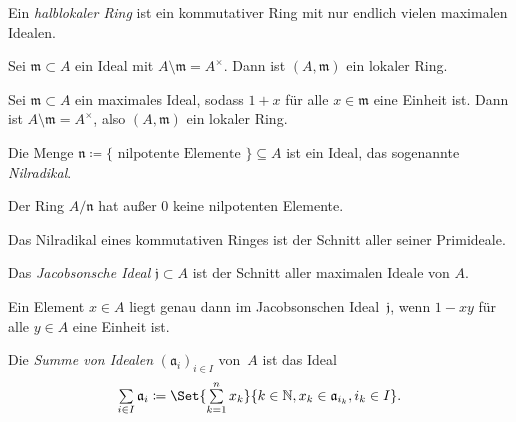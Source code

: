 \documentclass{cheat-sheet}
\newcommand{\aaa}{\mathfrak{a}}
\newcommand{\jjj}{\mathfrak{j}}
\newcommand{\mmm}{\mathfrak{m}}
\newcommand{\nnn}{\mathfrak{n}}
\begin{document}
\begin{defn}
  Ein \emph{halblokaler Ring} ist ein kommutativer Ring mit nur endlich vielen maximalen Idealen.
\end{defn}

\begin{lem}
  Sei $\mmm \subset A$ ein Ideal mit $A \setminus \mmm = A^\times$.
  Dann ist $(A, \mmm)$ ein lokaler Ring.
\end{lem}

\begin{prop}
  Sei $\mmm \subset A$ ein maximales Ideal, sodass $1 + x$ für alle $x \in \mmm$ eine Einheit ist.
  Dann ist $A \setminus \mmm = A^\times$, also $(A, \mmm)$ ein lokaler Ring.
\end{prop}



\begin{prop}
  Die Menge $\nnn \coloneqq \{ \text{ nilpotente Elemente } \} \subseteq A$ ist ein Ideal, das sogenannte \emph{Nilradikal}.
\end{prop}

\begin{bem}
  Der Ring $A/\nnn$ hat außer $0$ keine nilpotenten Elemente.
\end{bem}

\begin{prop}
  Das Nilradikal eines kommutativen Ringes ist der Schnitt aller seiner Primideale.
\end{prop}


\begin{defn}
  Das \emph{Jacobsonsche Ideal} $\jjj \subset A$ ist der Schnitt aller maximalen Ideale von $A$.
\end{defn}

\begin{prop}
  Ein Element $x \!\in\! A$ liegt genau dann im Jacobsonschen Ideal~$\jjj$, wenn $1 - xy$ für alle $y \in A$ eine Einheit ist.
\end{prop}



\begin{defn}
  Die \emph{Summe von Idealen} $(\aaa_i)_{i \in I}$ von~$A$ ist das Ideal
  \[
    \sum_{i \in I} \aaa_i \coloneqq \Set{\sum_{k=1}^n x_k}{k \in \N, x_k \in \aaa_{i_k}, i_k \in I}.
  \]
\end{defn}
\end{document}
